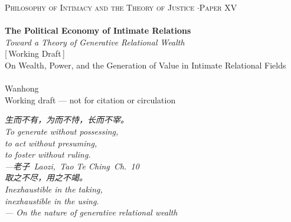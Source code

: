 \documentclass[11pt,a4paper]{article}
\begin{document}
\thispagestyle{empty}
\begin{center}
\vspace*{2cm}
{\footnotesize\color{rosedeep}\scshape Philosophy of Intimacy and the Theory of Justice \quad$\cdot$\quad Paper XV}\\[0.3cm]
\coverrule\\[1.2cm]
{\LARGE\bfseries\color{warnred} The Political Economy of Intimate Relations}\\[0.8cm]
{\large\itshape\color{warnred} Toward a Theory of Generative Relational Wealth}\\[0.8cm]
{\small\color{gold} [\,Working Draft\,]}\\[0.8cm]
{\normalsize\color{inksoft} On Wealth, Power, and the Generation of Value in Intimate Relational Fields}\\[2cm]
\coverrule[0.25]\\[0.6cm]
{\normalsize\color{inksoft} Wanhong}\\
\vfill
{\footnotesize\color{gold} Working draft --- not for citation or circulation}
\coverfootnote
\end{center}
\newpage

\thispagestyle{empty}
\vspace*{2.4cm}
\begin{center}
\begin{minipage}{0.74\linewidth}
\centering\itshape\color{rose}
{\cjk 生而不有，为而不恃，长而不宰。}\\[0.4em]
To generate without possessing,\\
to act without presuming,\\
to foster without ruling.\\[0.8em]
{\upshape\footnotesize\color{gold} ---{\cjk 老子}\ Laozi,\ \emph{Tao Te Ching}\ Ch.~10}\\[1.2em]
{\cjk 取之不尽，用之不竭。}\\[0.4em]
Inexhaustible in the taking,\\
inexhaustible in the using.\\[0.6em]
{\upshape\footnotesize\color{gold} --- On the nature of generative relational wealth}
\end{minipage}
\end{center}
\newpage
\end{document}

